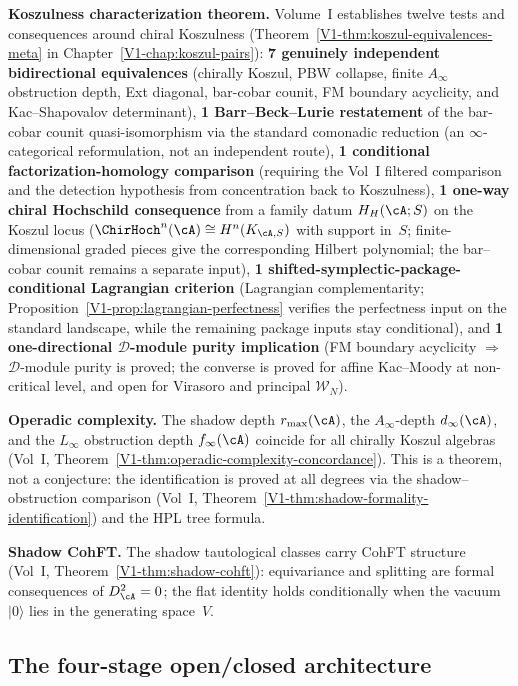 \medskip\noindent
\textbf{Koszulness characterization theorem.}\enspace
Volume~I establishes twelve tests and consequences around chiral
Koszulness
(Theorem~\ref*{V1-thm:koszul-equivalences-meta} in
Chapter~\ref*{V1-chap:koszul-pairs}):
\textbf{7 genuinely independent bidirectional equivalences}
(chirally Koszul, PBW collapse, finite $A_\infty$ obstruction depth,
Ext diagonal, bar-cobar counit, FM boundary acyclicity,
and Kac--Shapovalov determinant),
\textbf{1 Barr--Beck--Lurie restatement}
of the bar-cobar counit quasi-isomorphism via the standard
comonadic reduction (an $\infty$-categorical reformulation,
not an independent route),
\textbf{1 conditional factorization-homology comparison}
(requiring the Vol~I filtered comparison and the detection
hypothesis from concentration back to Koszulness),
\textbf{1 one-way chiral Hochschild consequence}
from a family datum $H_H(\cA;S)$ on the Koszul locus
($\ChirHoch^n(\cA)\cong H^n(K_{\cA,S})$ with support in~$S$;
finite-dimensional graded pieces give the corresponding Hilbert
polynomial; the bar--cobar counit remains a separate input),
\textbf{1 shifted-symplectic-package-conditional Lagrangian criterion}
(Lagrangian complementarity; Proposition~\ref*{V1-prop:lagrangian-perfectness}
verifies the perfectness input on the standard landscape, while the
remaining package inputs stay conditional),
and
\textbf{1 one-directional $\mathcal{D}$-module purity implication}
(FM boundary acyclicity $\Rightarrow$
$\mathcal{D}$-module purity is proved; the converse is proved for
affine Kac--Moody at non-critical level, and open for Virasoro
and principal $\mathcal{W}_N$).

\medskip\noindent
\textbf{Operadic complexity.}\enspace
The shadow depth $r_{\max}(\cA)$, the $A_\infty$-depth
$d_\infty(\cA)$, and the $L_\infty$ obstruction depth
$f_\infty(\cA)$ coincide for all chirally Koszul algebras
(Vol~I, Theorem~\ref*{V1-thm:operadic-complexity-concordance}).
This is a theorem, not a conjecture: the identification is
proved at all degrees via the shadow--obstruction comparison
(Vol~I, Theorem~\ref*{V1-thm:shadow-formality-identification})
and the HPL tree formula.

\medskip\noindent
\textbf{Shadow CohFT.}\enspace
The shadow tautological classes carry CohFT structure
(Vol~I, Theorem~\ref*{V1-thm:shadow-cohft}):
equivariance and splitting are formal consequences of
$D_\cA^2 = 0$; the flat identity holds conditionally
when the vacuum $|0\rangle$ lies in the generating
space~$V$.

\subsection{The four-stage open/closed architecture}

